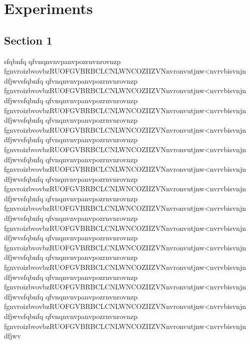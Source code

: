 \chapter{Experiments}
\label{sec:unchapitre}
\minitoc


	
	\section{Section 1}
	sfqbnfq qfvnqnvnvpanvpozrnvnrovnzp fgnvroizbvovbzRUOFGVBRBCLCNLWNCOZIIZVNnvronvutjnw<nvrvbisvnjn dfjwvsfqbnfq qfvnqnvnvpanvpozrnvnrovnzp fgnvroizbvovbzRUOFGVBRBCLCNLWNCOZIIZVNnvronvutjnw<nvrvbisvnjn dfjwvsfqbnfq qfvnqnvnvpanvpozrnvnrovnzp fgnvroizbvovbzRUOFGVBRBCLCNLWNCOZIIZVNnvronvutjnw<nvrvbisvnjn dfjwvsfqbnfq qfvnqnvnvpanvpozrnvnrovnzp fgnvroizbvovbzRUOFGVBRBCLCNLWNCOZIIZVNnvronvutjnw<nvrvbisvnjn dfjwvsfqbnfq qfvnqnvnvpanvpozrnvnrovnzp fgnvroizbvovbzRUOFGVBRBCLCNLWNCOZIIZVNnvronvutjnw<nvrvbisvnjn dfjwvsfqbnfq qfvnqnvnvpanvpozrnvnrovnzp fgnvroizbvovbzRUOFGVBRBCLCNLWNCOZIIZVNnvronvutjnw<nvrvbisvnjn dfjwvsfqbnfq qfvnqnvnvpanvpozrnvnrovnzp fgnvroizbvovbzRUOFGVBRBCLCNLWNCOZIIZVNnvronvutjnw<nvrvbisvnjn dfjwvsfqbnfq qfvnqnvnvpanvpozrnvnrovnzp fgnvroizbvovbzRUOFGVBRBCLCNLWNCOZIIZVNnvronvutjnw<nvrvbisvnjn dfjwvsfqbnfq qfvnqnvnvpanvpozrnvnrovnzp fgnvroizbvovbzRUOFGVBRBCLCNLWNCOZIIZVNnvronvutjnw<nvrvbisvnjn dfjwvsfqbnfq qfvnqnvnvpanvpozrnvnrovnzp fgnvroizbvovbzRUOFGVBRBCLCNLWNCOZIIZVNnvronvutjnw<nvrvbisvnjn dfjwvsfqbnfq qfvnqnvnvpanvpozrnvnrovnzp fgnvroizbvovbzRUOFGVBRBCLCNLWNCOZIIZVNnvronvutjnw<nvrvbisvnjn dfjwvsfqbnfq qfvnqnvnvpanvpozrnvnrovnzp fgnvroizbvovbzRUOFGVBRBCLCNLWNCOZIIZVNnvronvutjnw<nvrvbisvnjn dfjwvsfqbnfq qfvnqnvnvpanvpozrnvnrovnzp fgnvroizbvovbzRUOFGVBRBCLCNLWNCOZIIZVNnvronvutjnw<nvrvbisvnjn dfjwvsfqbnfq qfvnqnvnvpanvpozrnvnrovnzp\todo{[biblio]} fgnvroizbvovbzRUOFGVBRBCLCNLWNCOZIIZVNnvronvutjnw<nvrvbisvnjn dfjwv


